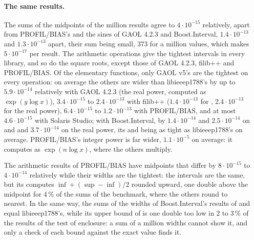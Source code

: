 \documentclass[12pt,a4paper,twoside,openright]{book}
\begin{document}
\paragraph{The same results.}
The sums of the midpoints of the million results agree to $4\cdot10^{-15}$
relatively, apart from PROFIL/BIAS's and the sines of GAOL 4.2.3 and
Boost.Interval, $1.4\cdot10^{-13}$ and $1.3\cdot10^{-13}$ apart, their sum
being small, 373 for a million values, which makes $5\cdot10^{-17}$ per
result. The arithmetic operations give the tightest intervals in every
library, and so do the square roots, except those of GAOL 4.2.3, filib++ and
PROFIL/BIAS. Of the elementary functions, only GAOL v5's are the tightest on
every operation: on average the others are wider than libieeep1788's by up
to $5.9\cdot10^{-14}$ relatively with GAOL 4.2.3 (the real power, computed
as $\exp(y \log x)$), $3.4\cdot10^{-15}$ to $2.4\cdot10^{-13}$ with filib++
($1.4\cdot10^{-13}$ for , $2.4\cdot10^{-13}$ for the real power),
$6.4\cdot10^{-15}$ to $1.2\cdot10^{-13}$ with PROFIL/BIAS, and at most
$4.6\cdot10^{-15}$ with Solaris Studio; with Boost.Interval, by
$1.4\cdot10^{-14}$ and $2.5\cdot10^{-14}$ on  and  and
$3.7\cdot10^{-14}$ on the real power, its  and  being as
tight as libieeep1788's on average. PROFIL/BIAS's integer power is far
wider, $1.1\cdot10^{-5}$ on average: it computes  as
$\exp(n \log x)$, where the others multiply.

\begin{Rem}
The arithmetic results of PROFIL/BIAS have midpoints that differ by
$8\cdot10^{-15}$ to $4\cdot10^{-14}$ relatively while their widths are the
tightest: the intervals are the same, but its  computes
$\inf + (\sup - \inf)/2$ rounded upward, one double above the midpoint for
4\,\% of the sums of the benchmark, where the others round to nearest. In
the same way, the sums of the widths of Boost.Interval's results of
 and  equal libieeep1788's, while its upper bound of
 is one double too low in 2 to 3\,\% of the results of the test of
enclosure: a sum of a million widths cannot show it, and only a check of
each bound against the exact value finds it.
\end{Rem}
\end{document}
